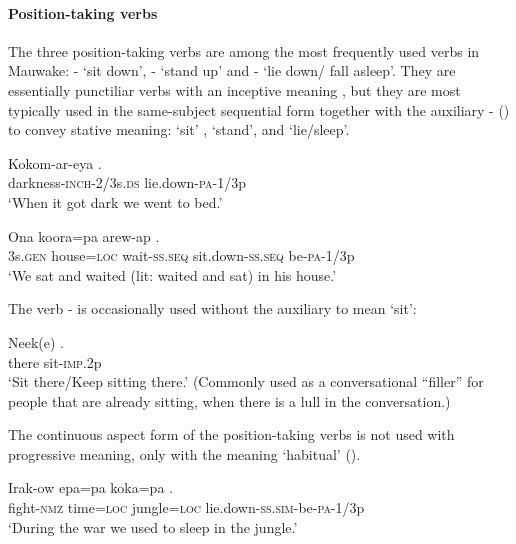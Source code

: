 \paragraph{Position-taking verbs}\label{sec:3:a:z:y:x}
{}
The three position-taking verbs are among the most frequently used verbs in Mauwake: - `sit down', - `stand up' and - `lie down/ fall asleep'. They are essentially punctiliar verbs with an inceptive meaning , but they are most typically used in the same-subject sequential form together with the auxiliary - () to convey stative meaning: `sit' , `stand', and `lie/sleep'.

\ea%
\label{ex:3:x273}
\gll Kokom-ar-eya . \\
darkness-\textsc{inch}-2/3s.\textsc{ds} lie.down-\textsc{pa}-1/3p \\
\glt`When it got dark we went to bed.'
\z

\ea%
\label{ex:3:x274}
\gll Ona koora=pa arew-ap  . \\
3s.\textsc{gen} house=\textsc{loc} wait-\textsc{ss}.\textsc{seq} sit.down-\textsc{ss}.\textsc{seq} be-\textsc{pa}-1/3p\\
\glt`We sat and waited (lit: waited and sat) in his house.'
\z

The verb - is occasionally used without the auxiliary to mean `sit': 

\ea%
\label{ex:3:x1824}
\gll Neek(e) . \\
there sit-\textsc{imp}.2p\\
\glt`Sit there/Keep sitting there.' (Commonly used as a conversational ``filler'' for people that are already sitting, when there is a lull in the conversation.)
\z

The continuous aspect form of the position-taking verbs is not used with progressive meaning, only with the meaning `habitual' (). 

\ea%
\label{ex:3:x275}
\gll Irak-ow epa=pa koka=pa . \\
fight-\textsc{nmz} time=\textsc{loc} jungle=\textsc{loc} lie.down-\textsc{ss}.\textsc{sim}-be-\textsc{pa}-1/3p \\
\glt`During the war we used to sleep in the jungle.'
\z

